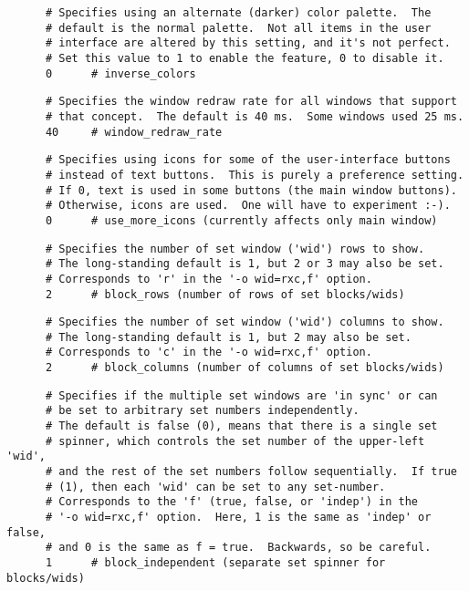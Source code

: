    \begin{verbatim}
      # Specifies using an alternate (darker) color palette.  The
      # default is the normal palette.  Not all items in the user
      # interface are altered by this setting, and it's not perfect.
      # Set this value to 1 to enable the feature, 0 to disable it.
      0      # inverse_colors
   \end{verbatim}

   \begin{verbatim}
      # Specifies the window redraw rate for all windows that support
      # that concept.  The default is 40 ms.  Some windows used 25 ms.
      40     # window_redraw_rate
   \end{verbatim}

   \begin{verbatim}
      # Specifies using icons for some of the user-interface buttons
      # instead of text buttons.  This is purely a preference setting.
      # If 0, text is used in some buttons (the main window buttons).
      # Otherwise, icons are used.  One will have to experiment :-).
      0      # use_more_icons (currently affects only main window)
   \end{verbatim}

   \begin{verbatim}
      # Specifies the number of set window ('wid') rows to show.
      # The long-standing default is 1, but 2 or 3 may also be set.
      # Corresponds to 'r' in the '-o wid=rxc,f' option.
      2      # block_rows (number of rows of set blocks/wids)
   \end{verbatim}

   \begin{verbatim}
      # Specifies the number of set window ('wid') columns to show.
      # The long-standing default is 1, but 2 may also be set.
      # Corresponds to 'c' in the '-o wid=rxc,f' option.
      2      # block_columns (number of columns of set blocks/wids)
   \end{verbatim}

   \begin{verbatim}
      # Specifies if the multiple set windows are 'in sync' or can
      # be set to arbitrary set numbers independently.
      # The default is false (0), means that there is a single set
      # spinner, which controls the set number of the upper-left 'wid',
      # and the rest of the set numbers follow sequentially.  If true
      # (1), then each 'wid' can be set to any set-number.
      # Corresponds to the 'f' (true, false, or 'indep') in the
      # '-o wid=rxc,f' option.  Here, 1 is the same as 'indep' or false,
      # and 0 is the same as f = true.  Backwards, so be careful.
      1      # block_independent (separate set spinner for blocks/wids)
   \end{verbatim}

